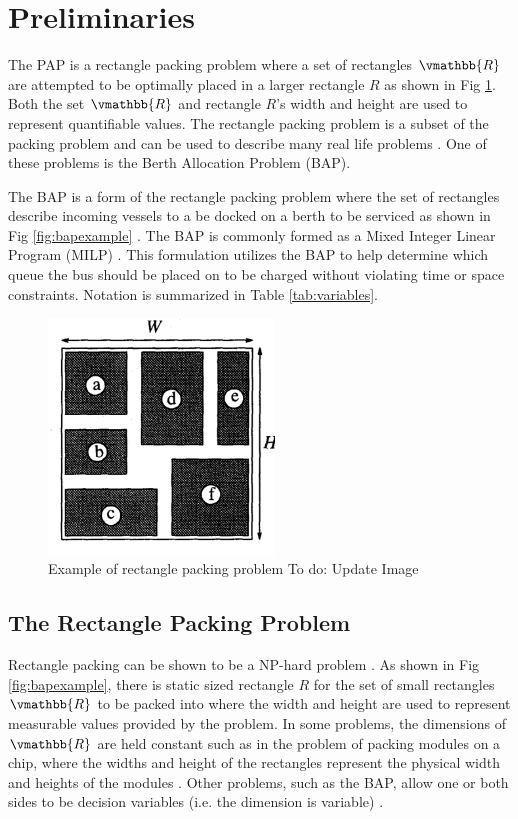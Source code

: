 \documentclass[letterpaper, 10pt, conference]{IEEEtran}
\newcommand{\TODO}[1]{{\color{green} To do: #1}} %
\begin{document}
\section{Preliminaries}
\label{sec:preliminaries}
The PAP is a rectangle packing problem where a set of rectangles \(\vmathbb{R}\) are attempted to be optimally placed in a larger rectangle \(R\) as shown in Fig \ref{fig:packexample}. Both the set \(\vmathbb{R}\) and rectangle \(R\)'s width and height are used to represent quantifiable values. The rectangle packing problem is a subset of the packing problem and can be used to describe many real life problems \cite{Bruin2013}. One of these problems is the Berth Allocation Problem (BAP).

The BAP is a form of the rectangle packing problem where the set of rectangles describe incoming vessels to a be docked on a berth to be serviced as shown in Fig \ref{fig:bapexample} \cite{Dai2008}. The BAP is commonly formed as a Mixed Integer Linear Program (MILP) \cite{Frojan2015,Buhrkal2010}. This formulation utilizes the BAP to help determine which queue the bus should be placed on to be charged without violating time or space constraints. Notation is summarized in Table \ref{tab:variables}.

\begin{figure}
	\centerline{\includegraphics[width=6cm]{chip-pack.png}}
	\caption{Example of rectangle packing problem \TODO{Update Image}}
	\label{fig:packexample}
\end{figure}

\subsection{The Rectangle Packing Problem}
Rectangle packing can be shown to be a NP-hard problem \cite{Murata1995}. As shown in Fig \ref{fig:bapexample}, there is static sized rectangle \(R\) for the set of small rectangles \(\vmathbb{R}\) to be packed into where the width and height are used to represent measurable values provided by the problem. In some problems, the dimensions of \(\vmathbb{R}\) are held constant such as in the problem of packing modules on a chip, where the widths and height of the rectangles represent the physical width and heights of the modules \cite{Murata1995}. Other problems, such as the BAP, allow one or both sides to be decision variables (i.e. the dimension is variable) \cite{Buhrkal2010}.
\end{document}
